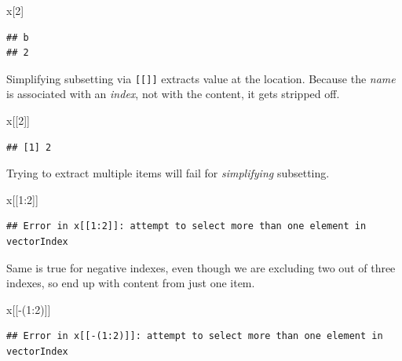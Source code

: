 \documentclass[
]{book}
\newenvironment{Shaded}{\begin{snugshade}}{\end{snugshade}}
\newcommand{\DecValTok}[1]{\textcolor[rgb]{0.00,0.00,0.81}{#1}}
\newcommand{\NormalTok}[1]{#1}
\newcommand{\SpecialCharTok}[1]{\textcolor[rgb]{0.00,0.00,0.00}{#1}}
\begin{document}
\begin{Shaded}
\begin{Highlighting}[]
\NormalTok{x[}\DecValTok{2}\NormalTok{]}
\end{Highlighting}
\end{Shaded}

\begin{verbatim}
## b 
## 2
\end{verbatim}

Simplifying subsetting via \texttt{{[}{[}{]}{]}} extracts value at the location. Because the \emph{name} is associated with an \emph{index}, not with the content, it gets stripped off.

\begin{Shaded}
\begin{Highlighting}[]
\NormalTok{x[[}\DecValTok{2}\NormalTok{]]}
\end{Highlighting}
\end{Shaded}

\begin{verbatim}
## [1] 2
\end{verbatim}

Trying to extract multiple items will fail for \emph{simplifying} subsetting.

\begin{Shaded}
\begin{Highlighting}[]
\NormalTok{x[[}\DecValTok{1}\SpecialCharTok{:}\DecValTok{2}\NormalTok{]]}
\end{Highlighting}
\end{Shaded}

\begin{verbatim}
## Error in x[[1:2]]: attempt to select more than one element in vectorIndex
\end{verbatim}

Same is true for negative indexes, even though we are excluding two out of three indexes, so end up with content from just one item.

\begin{Shaded}
\begin{Highlighting}[]
\NormalTok{x[[}\SpecialCharTok{{-}}\NormalTok{(}\DecValTok{1}\SpecialCharTok{:}\DecValTok{2}\NormalTok{)]]}
\end{Highlighting}
\end{Shaded}

\begin{verbatim}
## Error in x[[-(1:2)]]: attempt to select more than one element in vectorIndex
\end{verbatim}
\end{document}
